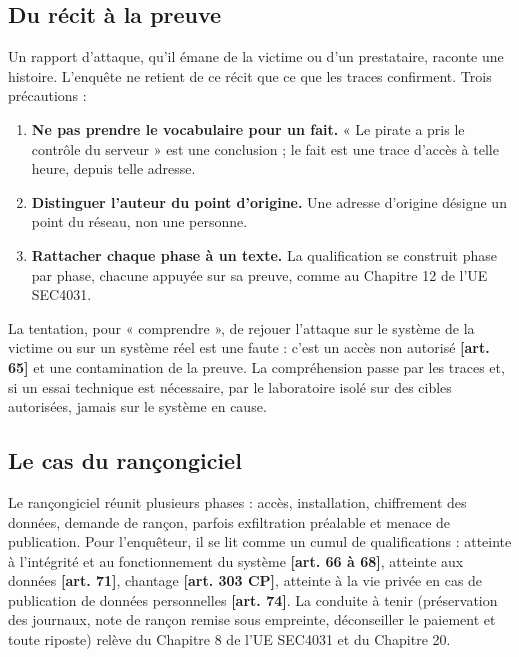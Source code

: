 \subsection{Du récit à la preuve}

Un rapport d'attaque, qu'il émane de la victime ou d'un prestataire, raconte une histoire. L'enquête ne retient de ce récit que ce que les traces confirment. Trois précautions :

\begin{enumerate}
\item \textbf{Ne pas prendre le vocabulaire pour un fait.} « Le pirate a pris le contrôle du serveur » est une conclusion ; le fait est une trace d'accès à telle heure, depuis telle adresse.
\item \textbf{Distinguer l'auteur du point d'origine.} Une adresse d'origine désigne un point du réseau, non une personne.
\item \textbf{Rattacher chaque phase à un texte.} La qualification se construit phase par phase, chacune appuyée sur sa preuve, comme au Chapitre 12 de l'UE SEC4031.
\end{enumerate}

\begin{boxalert}
La tentation, pour « comprendre », de rejouer l'attaque sur le système de la victime ou sur un système réel est une faute : c'est un accès non autorisé \textbf{[art. 65]} et une contamination de la preuve. La compréhension passe par les traces et, si un essai technique est nécessaire, par le laboratoire isolé sur des cibles autorisées, jamais sur le système en cause.
\end{boxalert}

\subsection{Le cas du rançongiciel}

Le rançongiciel réunit plusieurs phases : accès, installation, chiffrement des données, demande de rançon, parfois exfiltration préalable et menace de publication. Pour l'enquêteur, il se lit comme un cumul de qualifications : atteinte à l'intégrité et au fonctionnement du système \textbf{[art. 66 à 68]}, atteinte aux données \textbf{[art. 71]}, chantage \textbf{[art. 303 CP]}, atteinte à la vie privée en cas de publication de données personnelles \textbf{[art. 74]}. La conduite à tenir (préservation des journaux, note de rançon remise sous empreinte, déconseiller le paiement et toute riposte) relève du Chapitre 8 de l'UE SEC4031 et du Chapitre 20.

